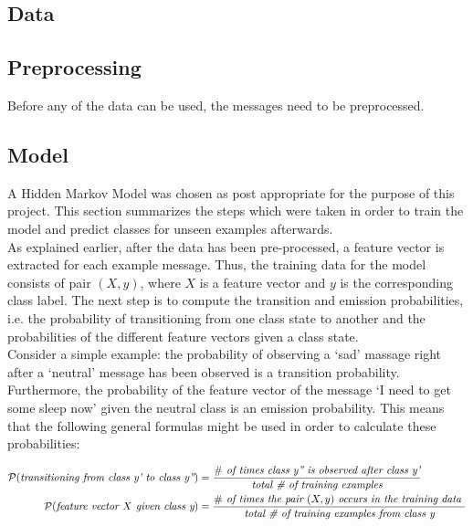 \documentclass{article}
\begin{document}
\subsection{Data}



\subsection{Preprocessing}

Before any of the data can be used, the messages need to be preprocessed. 



\subsection{Model}


A Hidden Markov Model was chosen as post appropriate for the purpose of this project. This section summarizes the steps which were taken in order to train the model and predict classes for unseen examples afterwards. \\

\noindent As explained earlier, after the data has been pre-processed, a feature vector is extracted for each example message. Thus, the training data for the model consists of pair $(X, y)$, where $X$ is a feature vector and $y$ is the corresponding class label. The next step is to compute the transition and emission probabilities, i.e. the probability of transitioning from one class state to another and the probabilities of the different feature vectors given a class state. \\

\noindent  Consider a simple example: the probability of observing a `sad' massage right after a `neutral' message has been observed is a transition probability. Furthermore, the probability of the feature vector of the message `I need to get some sleep now' given the neutral class is an emission probability. This means that the following general formulas might be used in order to calculate these probabilities:

\begin{align*}
\cal{P} (\textit{transitioning from class y' to class y''}) 
&= \frac {\# \textit{ of times class y'' is observed after class y'}} {\textit {total \# of training examples}} \\
\cal{P} (\textit{feature vector $X$ given class y}) 
&= \frac {\# \textit{ of times the pair $(X, y)$ occurs in the training data }} {\textit {total \# of training examples from class y}} \\
\end{align*}
\end{document}
